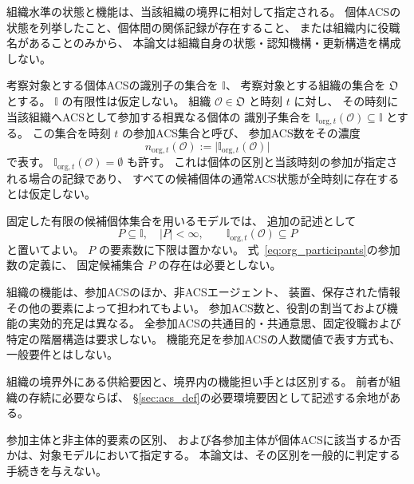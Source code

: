 組織水準の状態と機能は、当該組織の境界に相対して指定される。
個体ACSの状態を列挙したこと、個体間の関係記録が存在すること、
または組織内に役職名があることのみから、
本論文は組織自身の状態・認知機構・更新構造を構成しない。

\begin{definition}[参加ACSの時刻別記録]
\label{def:org_participation}
考察対象とする個体ACSの識別子の集合を $\mathbb{I}$、
考察対象とする組織の集合を $\mathfrak{O}$ とする。
$\mathbb{I}$ の有限性は仮定しない。
組織 $\mathcal O\in\mathfrak{O}$ と時刻 $t$ に対し、
その時刻に当該組織へACSとして参加する相異なる個体の
識別子集合を $\mathbb{I}_{\mathrm{org},t}(\mathcal O)\subseteq\mathbb{I}$ とする。
この集合を時刻 $t$ の参加ACS集合と呼び、
参加ACS数をその濃度
\begin{equation}
  n_{\mathrm{org},t}(\mathcal O)
  :=\bigl|\mathbb{I}_{\mathrm{org},t}(\mathcal O)\bigr|
  \label{eq:org_participants}
\end{equation}
で表す。
$\mathbb{I}_{\mathrm{org},t}(\mathcal O)=\emptyset$ も許す。
これは個体の区別と当該時刻の参加が指定される場合の記録であり、
すべての候補個体の通常ACS状態が全時刻に存在するとは仮定しない。

固定した有限の候補個体集合を用いるモデルでは、
追加の記述として
\begin{equation}
  P\subseteq\mathbb{I},\quad |P|<\infty,
  \qquad
  \mathbb{I}_{\mathrm{org},t}(\mathcal O)\subseteq P
  \label{eq:org_candidate_pool}
\end{equation}
と置いてよい。
$P$ の要素数に下限は置かない。
式~\eqref{eq:org_participants}の参加数の定義に、
固定候補集合 $P$ の存在は必要としない。
\end{definition}

\begin{remark}[構成員と機能担い手]
\label{rem:org_participants_functions}
組織の機能は、参加ACSのほか、非ACSエージェント、
装置、保存された情報その他の要素によって担われてもよい。
参加ACS数と、役割の割当ておよび機能の実効的充足は異なる。
全参加ACSの共通目的・共通意思、固定役職および
特定の階層構造は要求しない。
機能充足を参加ACSの人数閾値で表す方式も、一般要件とはしない。

組織の境界外にある供給要因と、境界内の機能担い手とは区別する。
前者が組織の存続に必要ならば、
\S\ref{sec:acs_def}の必要環境要因として記述する余地がある。

参加主体と非主体的要素の区別、
および各参加主体が個体ACSに該当するか否かは、対象モデルにおいて指定する。
本論文は、その区別を一般的に判定する手続きを与えない。
\end{remark}

